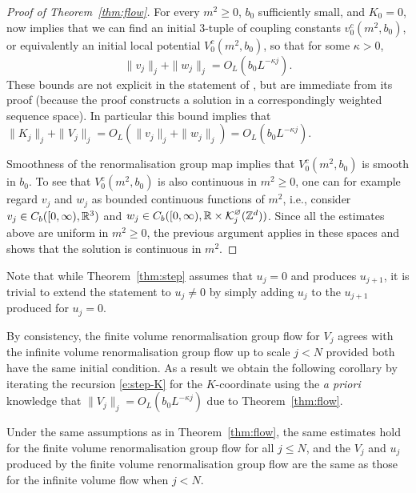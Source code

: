 \documentclass[11pt]{amsart}
\numberwithin{equation}{section}
\numberwithin{theorem}{section}
\newcommand{\1}{{\bf 1}}
\newcommand{\cKbulk}{\cK^\varnothing}
\newcommand{\OL}{O_L}
\begin{document}
\begin{proof}[Proof of Theorem~\ref{thm:flow}]
  For every $m^2\geq 0$, $b_0$ sufficiently small, and $K_0=0$,  \cite[Theorem 2.16]{MR2523458} now implies that we can find 
  an initial $3$-tuple of coupling constants $v_0^c(m^{2},b_{0})$, or equivalently an initial local potential $V_{0}^{c}(m^{2},b_{0})$, so that
  for some $\kappa>0$,
  \begin{equation}
    \|v_j\|_{j}+\|w_j\|_{j}=\OL(b_0L^{-\kappa j}).
  \end{equation}
  These bounds are not explicit in the statement
  of \cite[Theorem 2.16]{MR2523458}, but are immediate from its proof
  (because the proof constructs a solution in a correspondingly weighted sequence space).
  In particular this bound implies that $\|K_j\|_j+\|V_j\|_j=
  \OL(\|v_j\|_{j}+ \|w_j\|_{j})=\OL(b_0L^{-\kappa j})$.

  Smoothness of the renormalisation group map implies that $V_{0}^{c}(m^{2},b_{0})$ is smooth in $b_{0}$.
  To see that $V_0^c(m^2,b_0)$ is also continuous in $m^2 \geq 0$, one can for example regard $v_j$ and $w_j$
  as bounded continuous functions of $m^2$, i.e., consider
  $v_j \in C_b([0,\infty),\mathbb{R}^3)$ and
  $w_j\in C_b([0,\infty), \R \times \cKbulk_j(\Z^d))$. Since all the
  estimates above are uniform in $m^2 \geq 0$, the previous argument
  applies in these spaces and
  shows that the solution is continuous in $m^{2}$.
\end{proof}

\begin{remark}
Note that while Theorem~\ref{thm:step} assumes that $u_j=0$
and produces $u_{j+1}$, it is trivial to extend the statement to $u_j\neq 0$
by simply adding $u_j$ to the $u_{j+1}$ produced for $u_j=0$.
\end{remark}

\medskip

By consistency, the finite volume renormalisation group flow for $V_j$ agrees
with the infinite volume renormalisation group flow up to scale $j<N$
provided both have the same initial condition. As a result we obtain
the following corollary by iterating the recursion \eqref{e:step-K}
for the $K$-coordinate using the \emph{a priori} knowledge that
$\|V_j\|_j=\OL(b_0L^{-\kappa j})$ due to Theorem~\ref{thm:flow}.


\begin{corollary} \label{cor:flow-finvol}
  Under the same assumptions as in Theorem~\ref{thm:flow}, the same
  estimates hold for the finite volume renormalisation group flow
  for all $j \leq N$,
  and the $V_j$ and $u_j$ produced by the finite volume  renormalisation group flow
  are the same as those for the infinite volume flow when $j<N$.
\end{corollary}
\end{document}
